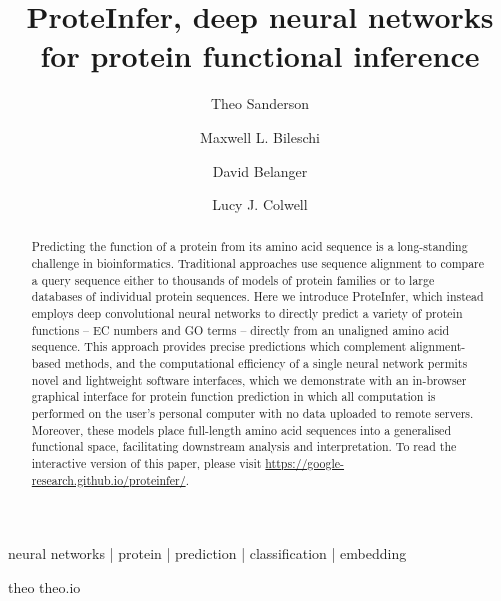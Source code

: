\title{ProteInfer, deep neural networks for protein functional inference}
\author[*,1,\Letter]{Theo Sanderson}
\author[*,2]{Maxwell L. Bileschi}
\author[2]{David Belanger}
\author[2]{Lucy J. Colwell}




\maketitle



\begin{abstract}
  Predicting the function of a protein from its amino acid sequence is a long-standing challenge in bioinformatics. Traditional approaches use sequence alignment to compare a query sequence either to thousands of models of protein families or to large databases of individual protein sequences. Here we introduce ProteInfer, which instead employs deep convolutional neural networks to directly predict a variety of protein functions -- EC numbers and GO terms -- directly from an unaligned amino acid sequence. This approach provides precise predictions which complement alignment-based methods, and the computational efficiency of a single neural network permits novel and lightweight software interfaces, which we demonstrate with an in-browser graphical interface for protein function prediction in which all computation is performed on the user's personal computer with no data uploaded to remote servers. Moreover, these models place full-length amino acid sequences into a generalised functional space, facilitating downstream analysis and interpretation. To read the interactive version of this paper, please visit \url{https://google-research.github.io/proteinfer/}.
\end {abstract}

\begin{keywords}
neural networks | protein | prediction | classification | embedding
\end{keywords}


\begin{corrauthor}
theo \at \;theo.io
\end{corrauthor}



